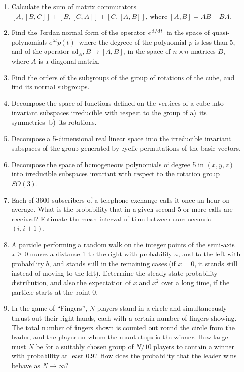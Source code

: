 \documentclass{article}
\begin{document}
\begin{enumerate}
\item Calculate the sum of matrix commutators $[A, [B, C]] + [B, [C, A]] + [C, [A, B]]$, where $[A, B] = AB - BA$.

\item Find the Jordan normal form of the operator $e^{\dv*{t}}$ in the space of quasi-polynomials ${e^{\lambda t} p(t)}$, where the degreee of the polynomial $p$ is less than 5, and of the operator $\textrm{ad}_A, B \mapsto [A, B]$, in the space of $n \times n$ matrices $B$, where $A$ is a diagonal matrix.

\item Find the orders of the subgroups of the group of rotations of the cube, and find its normal subgroups.

\item Decompose the space of functions defined on the vertices of a cube into invariant subspaces irreducible with respect to the group of a)~its symmetries, b)~its rotations.

\item Decompose a 5-dimensional real linear space into the irreducible invariant subspaces of the group generated by cyclic permutations of the basic vectors.

\item Decompose the space of homogeneous polynomials of degree 5 in $(x, y, z)$ into irreducible subspaces invariant with respect to the rotation group $SO(3)$.

\item Each of 3600 subscribers of a telephone exchange calls it once an hour on average. What is the probability that in a given second 5 or more calls are received? Estimate the mean interval of time between such seconds $(i, i+1)$.

\item A particle performing a random walk on the integer points of the semi-axis $x \geq 0$ moves a distance 1 to the right with probability $a$, and to the left with probability $b$, and stands still in the remaining cases (if $x = 0$, it stands still instead of moving to the left). Determine the steady-state probability distribution, and also the expectation of $x$ and $x^2$ over a long time, if the particle starts at the point 0.

\item In the game of ``Fingers'', $N$ players stand in a circle and simultaneously thrust out their right hands, each with a certain number of fingers showing. The total number of fingers  shown is counted out round the circle from the leader, and the player on whom the count stops is the winner. How large must $N$ be for a suitably chosen group of $N/10$ players to contain a winner with probability at least $0.9$? How does the probability that the leader wins behave as $N \to \infty$?


\end{enumerate}
\end{document}
